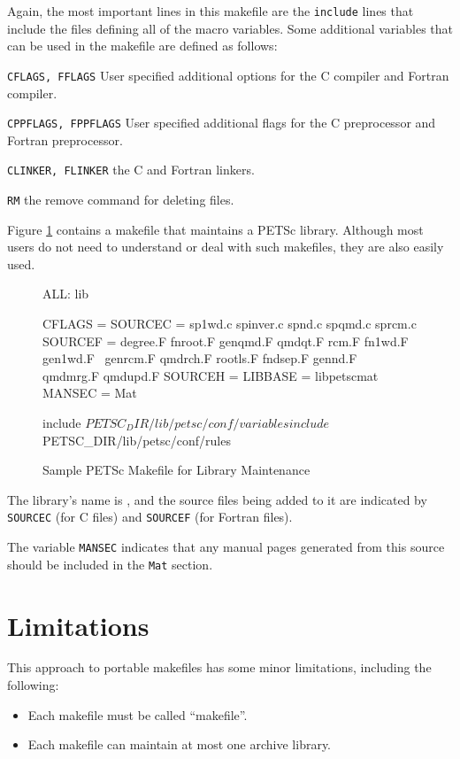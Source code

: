{{{Again, the most important lines in this makefile are the \lstinline{include}
lines that include the files defining all of the macro variables.
Some additional variables that can be used in the makefile are defined
as follows:
\begin{tightitemize}
\item \lstinline{CFLAGS, FFLAGS} User specified additional options for the C compiler and
        Fortran compiler.
\item \lstinline{CPPFLAGS, FPPFLAGS} User specified additional flags for the C preprocessor
        and Fortran preprocessor.
\item \lstinline{CLINKER, FLINKER} the C and Fortran linkers.
\item \lstinline{RM} the remove command for deleting files.
\end{tightitemize}

Figure \ref{fig_make3} contains a makefile that maintains a PETSc
library.  Although most users do not need to understand or deal with such
makefiles, they are also easily used.
\begin{figure}[H]
\begin{makelisting}
ALL: lib

CFLAGS   =
SOURCEC  = sp1wd.c spinver.c spnd.c spqmd.c sprcm.c
SOURCEF  = degree.F  fnroot.F genqmd.F qmdqt.F rcm.F fn1wd.F gen1wd.F \ 
          genrcm.F qmdrch.F rootls.F fndsep.F gennd.F qmdmrg.F qmdupd.F
SOURCEH  = 
LIBBASE  = libpetscmat
MANSEC   = Mat

include ${PETSC_DIR}/lib/petsc/conf/variables
include ${PETSC_DIR}/lib/petsc/conf/rules
\end{makelisting}
\caption{Sample PETSc Makefile for Library Maintenance}
\label{fig_make3}
\end{figure}

The library's name is , and the source files being added
to it are indicated by \lstinline{SOURCEC} (for C files) and \lstinline{SOURCEF} (for
Fortran files).

The variable \lstinline{MANSEC} indicates that any manual pages generated
from this source should be included in the \lstinline{Mat} section.

\section{Limitations}

This approach to portable makefiles has some minor limitations, including
the following:
\begin{itemize}
\item Each makefile must be called ``makefile''.
\item Each makefile can maintain at most one archive library.
\end{itemize}

}}}
